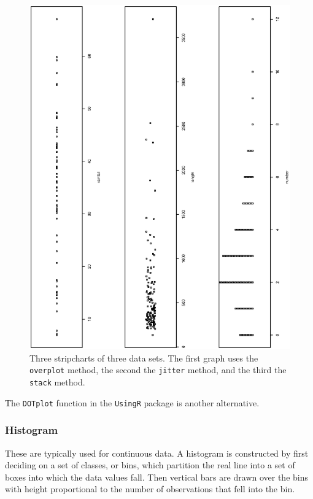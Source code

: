 \documentclass[captions=tableheading]{scrbook}
\begin{document}
  \begin{figure}[th]
    \includegraphics[angle=270, totalheight=4in]{ps/datadesc/stripcharts.ps}
    \caption[Strip charts of \texttt{precip}, \texttt{rivers}, and \texttt{discoveries}]{\small Three stripcharts of three data sets.  The first graph uses the \texttt{overplot} method, the second the \texttt{jitter} method, and the third the \texttt{stack} method.}
    \label{fig-stripcharts}
  \end{figure}


The \texttt{DOTplot} function in the \texttt{UsingR} package \cite{usingr} is another alternative.
\subsubsection{Histogram}
\label{sec-3-1-2-2}


These are typically used for continuous data. A histogram is constructed by first deciding on a set of classes, or bins, which partition the real line into a set of boxes into which the data values fall. Then vertical bars are drawn over the bins with height proportional to the number of observations that fell into the bin. 
\end{document}
